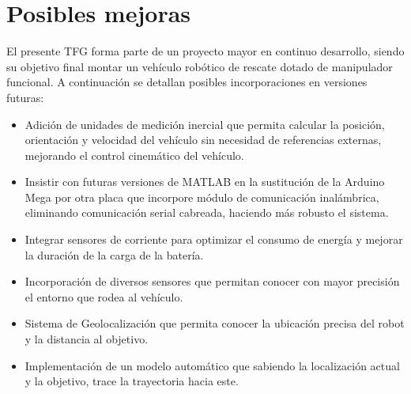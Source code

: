 \section{Posibles mejoras}
El presente TFG forma parte de un proyecto mayor en continuo desarrollo, siendo su objetivo final montar un vehículo robótico de rescate dotado de manipulador funcional. A continuación se detallan posibles incorporaciones en versiones futuras:

\begin{itemize}
    \item Adición de unidades de medición inercial que permita calcular la posición, orientación y velocidad del vehículo sin necesidad de referencias externas, mejorando el control cinemático del vehículo.
    \item Insistir con futuras versiones de MATLAB en la sustitución de la Arduino Mega por otra placa que incorpore módulo de comunicación inalámbrica, eliminando comunicación serial cabreada, haciendo más robusto el sistema.
    \item Integrar sensores de corriente para optimizar el consumo de energía y mejorar la duración de la carga de la batería.
    \item Incorporación de diversos sensores que permitan conocer con mayor precisión el entorno que rodea al vehículo.
    \item Sistema de Geolocalización que permita conocer la ubicación precisa del robot y la distancia al objetivo.
    \item Implementación de un modelo automático que sabiendo la localización actual y la objetivo, trace la trayectoria hacia este.
\end{itemize}

